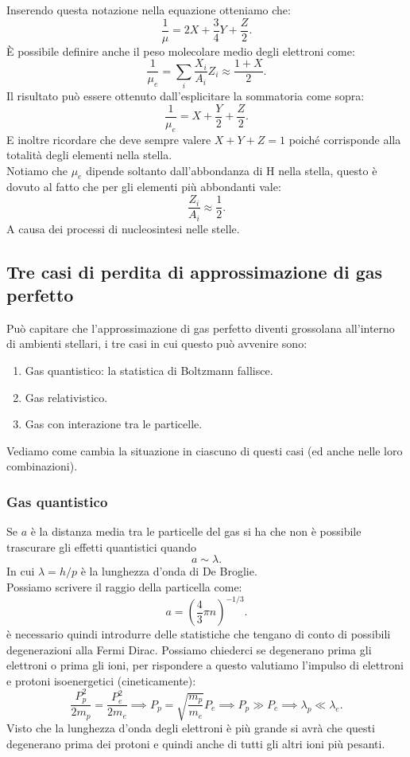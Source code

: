 Inserendo questa notazione nella equazione otteniamo che:
\[
	\frac{1}{\mu} = 2X + \frac{3}{4}Y+\frac{Z}{2}
.\] 
È possibile definire anche il peso molecolare medio degli elettroni come:
\[
	\frac{1}{\mu_e} = \sum_{i}^{} \frac{X_i}{A_i}Z_i \approx \frac{1+X}{2}
.\] 
Il risultato può essere ottenuto dall'esplicitare la sommatoria come sopra:
\[
	\frac{1}{\mu_e} = X +\frac{Y}{2}+\frac{Z}{2}
.\] 
E inoltre ricordare che deve sempre valere $X+Y+Z = 1$ poiché corrisponde alla totalità degli elementi nella stella.\\
Notiamo che $\mu_e$ dipende soltanto dall'abbondanza di H nella stella, questo è dovuto al fatto che per gli elementi più abbondanti vale:
\[
	\frac{Z_i}{A_i} \approx \frac{1}{2}
.\] 
A causa dei processi di nucleosintesi nelle stelle.
\subsection{Tre casi di perdita di approssimazione di gas perfetto}
\label{subsec:Tre casi di perdita di approssimazione di gas perfetto}
Può capitare che l'approssimazione di gas perfetto diventi grossolana all'interno di ambienti stellari, i tre casi in cui questo può avvenire sono:
\begin{enumerate}
	\item Gas quantistico: la statistica di Boltzmann fallisce.
	\item Gas relativistico.
	\item Gas con interazione tra le particelle.
\end{enumerate}
Vediamo come cambia la situazione in ciascuno di questi casi (ed anche nelle loro combinazioni).
\subsubsection{Gas quantistico}
\label{subsubsec:Gas quantistico}
Se $a$ è la distanza media tra le particelle del gas si ha che non è possibile trascurare gli effetti quantistici quando 
\[
	a \sim  \lambda
.\] 
In cui $\lambda  = h/p$ è la lunghezza d'onda di De Broglie.\\
Possiamo scrivere il raggio della particella come:
\[
	a = \left( \frac{4}{3}\pi n \right)^{-1/3} 
.\] 
è necessario quindi introdurre delle statistiche che tengano di conto di possibili degenerazioni alla Fermi Dirac. Possiamo chiederci se degenerano prima gli elettroni o prima gli ioni, per rispondere a questo valutiamo l'impulso di elettroni e protoni isoenergetici (cineticamente):
\[
	\frac{P_p^2}{2m_p}=\frac{P_e^2}{2m_e} \implies P_p = \sqrt{\frac{m_p}{m_e}} P_e \implies P_p \gg P_e \implies \lambda_p \ll \lambda_e
.\] 
Visto che la lunghezza d'onda degli elettroni è più grande si avrà che questi degenerano prima dei protoni e quindi anche di tutti gli altri ioni più pesanti.\\
